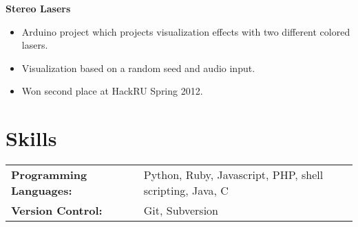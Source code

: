 \documentclass[centered,overlapped]{res}
\begin{document}
\begin{resume}
	{\bf Stereo Lasers}
	\begin{itemize} \itemsep -2pt
		\item Arduino project which projects visualization effects with two different colored lasers.
		\item Visualization based on a random seed and audio input.
		\item Won second place at HackRU Spring 2012.
	\end{itemize}

\section{Skills}
	\begin{tabular}{l l}
		\noindent \textbf{Programming Languages:} & Python, Ruby, Javascript, PHP, shell scripting, Java, C \\
		\noindent \textbf{Version Control:} & Git, Subversion \\
	\end{tabular}

\end{resume}
\end{document}
